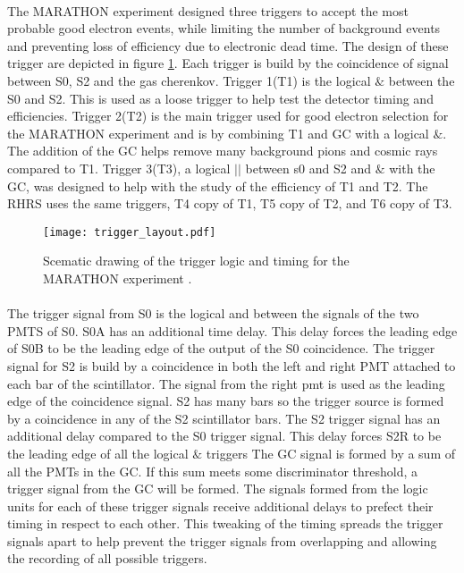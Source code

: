 \paragraph{} The MARATHON experiment designed three triggers to accept the most probable good electron events, while limiting the number of background events and preventing loss of efficiency due to electronic dead time. The design of these trigger are depicted in figure \ref{fig:trig_layout}. Each trigger is build by the coincidence of signal between S0, S2 and the gas cherenkov.  Trigger 1(T1) is the logical $\&$ between the S0 and S2. This is used as a loose trigger to help test the detector timing and efficiencies.  Trigger 2(T2) is the main trigger used for good electron selection for the MARATHON experiment and is by  combining T1 and GC with a logical $\&$. The addition of the GC helps remove many background pions and cosmic rays compared to T1. Trigger 3(T3), a logical $||$ between s0 and S2 and $\&$ with the GC, was designed to help with the study of the efficiency of T1 and T2. The RHRS uses the same triggers, T4 copy of T1, T5 copy of T2, and T6 copy of T3.
\begin{figure}[H]
	\hspace*{-2cm} 
	\texttt{[image: trigger\_layout.pdf]}
	\caption{Scematic drawing of the trigger logic and timing for the MARATHON experiment \cite{flo_trig}.}
	\label{fig:trig_layout}
\end{figure}
\paragraph{}The trigger signal from  S0 is the logical and between the signals of the two PMTS of S0. S0A has an additional time delay. This delay forces the leading edge of S0B to be the leading edge of the output of the S0 coincidence. The trigger signal for S2 is build by a coincidence in both the left and right PMT attached to each bar of the scintillator. The signal from the right pmt is used as the leading edge of the coincidence signal. S2 has many bars so the trigger source is formed by a coincidence in any of the S2 scintillator bars. The S2 trigger signal has an additional delay compared to the S0 trigger signal. This delay forces S2R to be the leading edge of all the logical $\&$ triggers The GC signal is formed by a sum of all the PMTs in the GC. If this sum meets some discriminator threshold, a trigger signal from the GC will be formed. The signals formed from the logic units for each of these trigger signals receive additional delays to prefect their timing in respect to each other. This tweaking of the timing spreads the trigger signals apart to help prevent the trigger signals from overlapping and allowing the recording of all possible triggers. 
 
